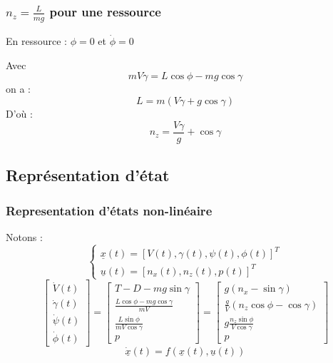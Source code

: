 \documentclass[footheight=2em]{beamer}
\begin{document}

\begin{frame}
    \frametitle{$n_z = \frac{L}{mg}$ pour une ressource}\pause
    En ressource : $\phi = 0$ et $\dot{\phi} = 0$\pause

    Avec $$mV\dot{\gamma} = L\cos \phi - mg \cos \gamma$$
    on a :$$L = m(V\dot{\gamma} + g \cos \gamma)$$ \pause
    D'où :$$\boxed{n_z = \frac{V\dot{\gamma}}{g} + \cos \gamma}$$
\end{frame}

\subsection{Représentation d'état}

\begin{frame}
    \frametitle{Representation d'états non-linéaire}\pause
    Notons :
    $$
    \left\{
    \begin{array}{l}
        \underline{x}(t) = [V(t), \gamma (t), \psi (t), \phi (t)]^{T}\\
        \underline{u}(t) = [n_x(t), n_z(t), p(t)]^{T}
    \end{array}
    \right.
    $$\pause
    $$
    \left[
    \begin{array}{c}
        \dot{V}(t)\\
        \dot{\gamma}(t)\\
        \dot{\psi}(t)\\
        \dot{\phi}(t)
    \end{array}
    \right]
    =
    \left[
    \begin{array}{c}
        T - D - mg \sin \gamma\\
        \frac{L\cos \phi - mg\cos \gamma}{mV}\\
        \frac{L\sin \phi}{mV\cos \gamma} \\
        p
    \end{array}
    \right]
    =
    \left[
    \begin{array}{c}
        g(n_x - \sin \gamma) \\
        \frac{g}{V}(n_z \cos \phi - \cos \gamma)\\
        g \frac{n_z \sin \phi}{V \cos \gamma} \\
        p
    \end{array}
    \right]
    $$\pause
    $$
    \underline{\dot{x}}(t)=f(\underline{x}(t),\underline{u}(t))
    $$
\end{frame}
\end{document}
